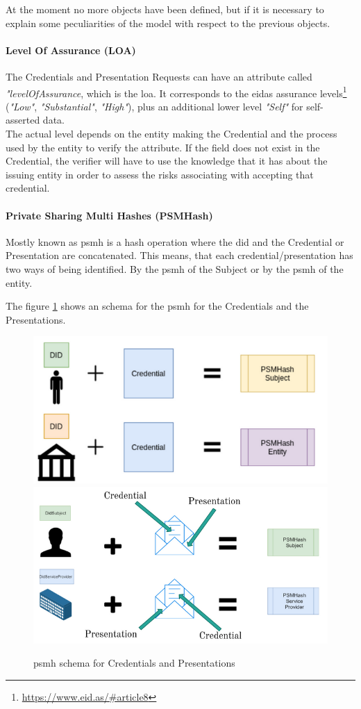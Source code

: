 \documentclass[a4paper, 12pt]{article} %
\begin{document}
            At the moment no more objects have been defined, but if it is necessary to explain some peculiarities of the model with respect to the previous objects.
            
            \paragraph{Level Of Assurance (LOA)}
                The Credentials and Presentation Requests can have an attribute called \textit{"levelOfAssurance}, which is the \acrfull{loa}. It corresponds to the \acrshort{eidas} assurance levels\footnote{\url{https://www.eid.as/\#article8}} (\textit{"Low"}, \textit{"Substantial"}, \textit{"High"}), plus an additional lower level \textit{"Self"} for self-asserted data. \\
                
                The actual level depends on the entity making the Credential and the process used by the entity to verify the attribute. If the field does not exist in the Credential, the verifier will have to use the knowledge that it has about the issuing entity in order to assess the risks associating with accepting that credential.
                
            \paragraph{Private Sharing Multi Hashes (PSMHash)}
                Mostly known as \acrshort{psmh} is a hash operation where the \acrshort{did} and the Credential or Presentation are concatenated. This means, that each credential/presentation has two ways of being identified. By the \acrshort{psmh} of the Subject or by the \acrshort{psmh} of the entity.
                
                The figure \ref{fig:psmh} shows an schema for the \acrshort{psmh} for the Credentials and the Presentations.
                \begin{figure}[h]
                    \centering
                    \includegraphics[width=.5\textwidth]{psmhash-credential.png}\hfill
                    \includegraphics[width=.5\textwidth]{psmhash-presentation.png}
                    \caption{\acrshort{psmh} schema for Credentials and Presentations}
                    \label{fig:psmh}
                \end{figure}
                
\end{document}
